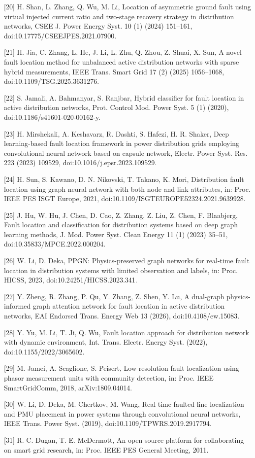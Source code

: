 \documentclass[
  11pt,
]{ctexart}
\begin{document}
{[}20{]} H. Shan, L. Zhang, Q. Wu, M. Li, Location of asymmetric ground
fault using virtual injected current ratio and two-stage recovery
strategy in distribution networks, CSEE J. Power Energy Syst. 10 (1)
(2024) 151--161, doi:10.17775/CSEEJPES.2021.07900.

{[}21{]} H. Jia, C. Zhang, L. He, J. Li, L. Zhu, Q. Zhou, Z. Shuai, X.
Sun, A novel fault location method for unbalanced active distribution
networks with sparse hybrid measurements, IEEE Trans. Smart Grid 17 (2)
(2025) 1056--1068, doi:10.1109/TSG.2025.3631276.

{[}22{]} S. Jamali, A. Bahmanyar, S. Ranjbar, Hybrid classifier for
fault location in active distribution networks, Prot. Control Mod. Power
Syst. 5 (1) (2020), doi:10.1186/s41601-020-00162-y.

{[}23{]} H. Mirshekali, A. Keshavarz, R. Dashti, S. Hafezi, H. R.
Shaker, Deep learning-based fault location framework in power
distribution grids employing convolutional neural network based on
capsule network, Electr. Power Syst. Res. 223 (2023) 109529,
doi:10.1016/j.epsr.2023.109529.

{[}24{]} H. Sun, S. Kawano, D. N. Nikovski, T. Takano, K. Mori,
Distribution fault location using graph neural network with both node
and link attributes, in: Proc. IEEE PES ISGT Europe, 2021,
doi:10.1109/ISGTEUROPE52324.2021.9639928.

{[}25{]} J. Hu, W. Hu, J. Chen, D. Cao, Z. Zhang, Z. Liu, Z. Chen, F.
Blaabjerg, Fault location and classification for distribution systems
based on deep graph learning methods, J. Mod. Power Syst. Clean Energy
11 (1) (2023) 35--51, doi:10.35833/MPCE.2022.000204.

{[}26{]} W. Li, D. Deka, PPGN: Physics-preserved graph networks for
real-time fault location in distribution systems with limited
observation and labels, in: Proc. HICSS, 2023,
doi:10.24251/HICSS.2023.341.

{[}27{]} Y. Zheng, R. Zhang, P. Qu, Y. Zhang, Z. Shen, Y. Lu, A
dual-graph physics-informed graph attention network for fault location
in active distribution networks, EAI Endorsed Trans. Energy Web 13
(2026), doi:10.4108/ew.15083.

{[}28{]} Y. Yu, M. Li, T. Ji, Q. Wu, Fault location approach for
distribution network with dynamic environment, Int. Trans. Electr.
Energy Syst. (2022), doi:10.1155/2022/3065602.

{[}29{]} M. Jamei, A. Scaglione, S. Peisert, Low-resolution fault
localization using phasor measurement units with community detection,
in: Proc. IEEE SmartGridComm, 2018, arXiv:1809.04014.

{[}30{]} W. Li, D. Deka, M. Chertkov, M. Wang, Real-time faulted line
localization and PMU placement in power systems through convolutional
neural networks, IEEE Trans. Power Syst. (2019),
doi:10.1109/TPWRS.2019.2917794.

{[}31{]} R. C. Dugan, T. E. McDermott, An open source platform for
collaborating on smart grid research, in: Proc. IEEE PES General
Meeting, 2011.
\end{document}
